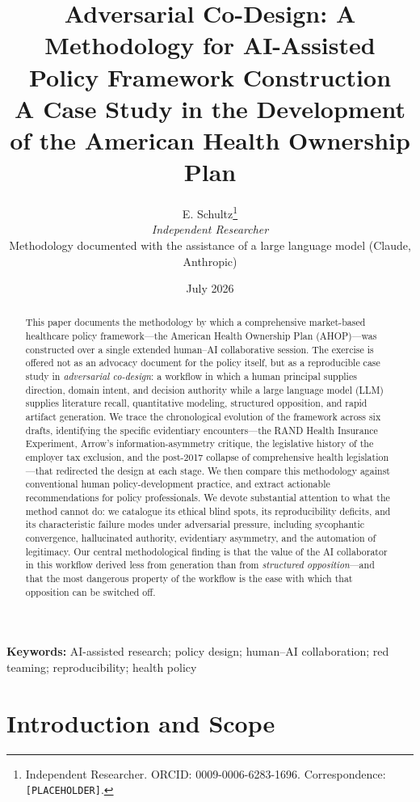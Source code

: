 \documentclass[11pt,a4paper]{article}
\title{\textbf{Adversarial Co-Design: A Methodology for AI-Assisted \\ Policy Framework Construction} \\[0.4em]
\large A Case Study in the Development of the American Health Ownership Plan}
\author{
  E. Schultz\thanks{Independent Researcher. ORCID: 0009-0006-6283-1696. Correspondence: \texttt{[PLACEHOLDER]}.} \\
  \textit{Independent Researcher} \\[0.6em]
  \small Methodology documented with the assistance of a large language model (Claude, Anthropic)
}
\date{July 2026}
\begin{document}
\maketitle

\begin{abstract}
\noindent
This paper documents the methodology by which a comprehensive market-based healthcare policy framework---the American Health Ownership Plan (AHOP)---was constructed over a single extended human--AI collaborative session. The exercise is offered not as an advocacy document for the policy itself, but as a reproducible case study in \emph{adversarial co-design}: a workflow in which a human principal supplies direction, domain intent, and decision authority while a large language model (LLM) supplies literature recall, quantitative modeling, structured opposition, and rapid artifact generation. We trace the chronological evolution of the framework across six drafts, identifying the specific evidentiary encounters---the RAND Health Insurance Experiment, Arrow's information-asymmetry critique, the legislative history of the employer tax exclusion, and the post-2017 collapse of comprehensive health legislation---that redirected the design at each stage. We then compare this methodology against conventional human policy-development practice, and extract actionable recommendations for policy professionals. We devote substantial attention to what the method cannot do: we catalogue its ethical blind spots, its reproducibility deficits, and its characteristic failure modes under adversarial pressure, including sycophantic convergence, hallucinated authority, evidentiary asymmetry, and the automation of legitimacy. Our central methodological finding is that the value of the AI collaborator in this workflow derived less from generation than from \emph{structured opposition}---and that the most dangerous property of the workflow is the ease with which that opposition can be switched off.
\end{abstract}

\vspace{0.5em}
\noindent\textbf{Keywords:} AI-assisted research; policy design; human--AI collaboration; red teaming; reproducibility; health policy

\tableofcontents
\newpage

\section{Introduction and Scope}
\label{sec:intro}
\end{document}
